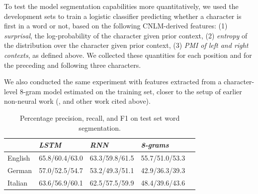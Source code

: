 To test the model segmentation capabilities more quantitatively, we
used the development sets to train a logistic classifier predicting whether a character is first
in a word or not, based on the following CNLM-derived features: (1)
\emph{surprisal}, the log-probability of the character given prior context, (2)
\emph{entropy} of the distribution over the character given prior
context, (3) \emph{PMI of left and right contexts}, as defined above.
We collected these quantities for each position and for the preceding and following three characters.

We also conducted the same experiment with features extracted from a
character-level 8-gram model estimated on the training set, closer to
the setup of earlier non-neural work
(\citet{saffran-word-1996, feng-accessor-2004}, and other work cited above).


\begin{table}[t]
  \begin{center}
    \begin{tabular}{l|l|l|l|l}
      \multicolumn{1}{c}{}&\emph{LSTM}&\emph{RNN}&\emph{8-grams}\\
      \hline
      English & 65.8/60.4/63.0 &   63.3/59.8/61.5 & 55.7/51.0/53.3    \\ %
      German &  57.0/52.5/54.7 &  53.2/49.3/51.1 & 42.9/36.3/39.3   \\ %
      Italian &  63.6/56.9/60.1 & 62.5/57.5/59.9  & 48.4/39.6/43.6    \\ %
    \end{tabular}
  \end{center}
  \caption{\label{tab:segmentation-results} Percentage precision, recall, and F1 on test set word segmentation.}
\end{table}

